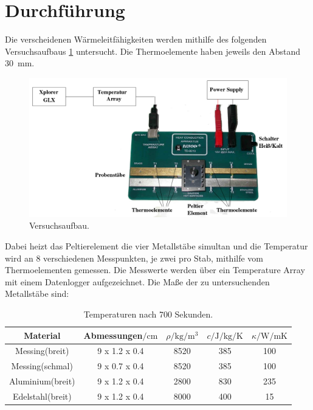 \section{Durchführung}
\label{sec:Durchführung}
Die verscheidenen Wärmeleitfähigkeiten werden mithilfe des folgenden Versuchsaufbaus \ref{fig:aufbau}
untersucht. Die Thermoelemente haben jeweils den Abstand \SI{30}{\milli\meter}.
\begin{figure}
    \centering
    \includegraphics[width=\textwidth]{content/aufbau.png}
    \caption{Versuchsaufbau.}
    \label{fig:aufbau}
\end{figure}
Dabei heizt das Peltierelement die vier Metallstäbe simultan und die Temperatur wird an 8
verschiedenen Messpunkten, je zwei pro Stab, mithilfe vom Thermoelementen gemessen. Die
Messwerte werden über ein Temperature Array mit einem Datenlogger aufgezeichnet.
Die Maße der zu untersuchenden Metallstäbe sind:
\begin{table}
    \centering
    \caption{Temperaturen nach 700 Sekunden.}
    \label{tab:werte}
    \begin{tabular}{c c S S S}
        \toprule
        {Material} & {Abmessungen$/\si{\centi\meter}$} &{$\rho/\si{\kg\per\meter\cubed}$} &{$c/\si{\joule\per\kg\per\kelvin}$} &{$\kappa/\si{\watt\per\meter\kelvin}$} \\
        \midrule
        Messing(breit) & 9 x 1.2 x 0.4 & 8520 & 385 & 100 \\
        Messing(schmal) & 9 x 0.7 x 0.4 & 8520 & 385 & 100 \\
        Aluminium(breit) & 9 x 1.2 x 0.4 & 2800 & 830 & 235 \\
        Edelstahl(breit) & 9 x 1.2 x 0.4 & 8000 & 400 & 15 \\
        \bottomrule
    \end{tabular}
\end{table}
%
